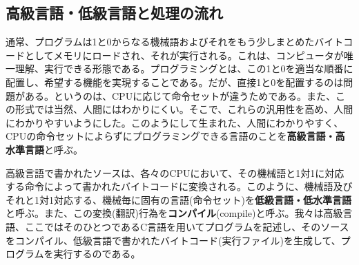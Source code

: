 \subsection{高級言語・低級言語と処理の流れ}
通常、プログラムは1と0からなる機械語およびそれをもう少しまとめたバイトコードとしてメモリにロードされ、それが実行される。これは、コンピュータが唯一理解、実行できる形態である。プログラミングとは、この1と0を適当な順番に配置し、希望する機能を実現することである。だが、直接1と0を配置するのは問題がある。というのは、CPUに応じて命令セットが違うためである。また、この形式では当然、人間にはわかりにくい。そこで、これらの汎用性を高め、人間にわかりやすいようにした。このようにして生まれた、人間にわかりやすく、CPUの命令セットによらずにプログラミングできる言語のことを\textbf{高級言語・高水準言語}と呼ぶ。

高級言語で書かれたソースは、各々のCPUにおいて、その機械語と1対1に対応する命令によって書かれたバイトコードに変換される。このように、機械語及びそれと1対1対応する、機械毎に固有の言語(命令セット)を\textbf{低級言語・低水準言語}と呼ぶ。また、この変換(翻訳)行為を\textbf{コンパイル}(compile)と呼ぶ。我々は高級言語、ここではそのひとつであるC言語を用いてプログラムを記述し、そのソースをコンパイル、低級言語で書かれたバイトコード(実行ファイル)を生成して、プログラムを実行するのである。

